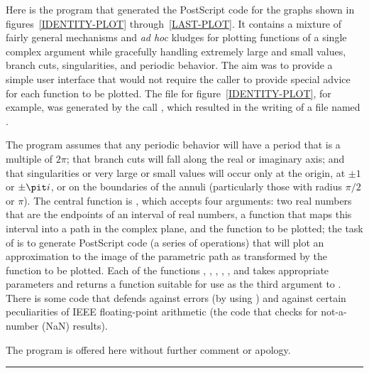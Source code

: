 \begin{new}

Here is the program that generated the PostScript code for
the graphs shown in figures~\ref{IDENTITY-PLOT} through~\ref{LAST-PLOT}.
It contains a mixture of fairly general mechanisms and {\it ad hoc} kludges
for plotting functions of a single complex argument while gracefully handling
extremely large and small values,
branch cuts, singularities, and periodic behavior.
The aim was to provide a simple user interface that would not
require the caller to provide special advice for each function
to be plotted.
The file for figure~\ref{IDENTITY-PLOT}, for example, was generated
by the call , which resulted in the writing of
a file named .

The program assumes that any periodic behavior will have a period that is a multiple of
$2\pi$; that branch cuts will fall along the real or imaginary axis;
and that singularities or very large or small values
will occur only at the origin, at $\pm 1$ or $\pm {\it i}$,
or on the boundaries of the annuli (particularly those with radius $\pi/2$ or $\pi$).
The central function is , which accepts four arguments:
two real numbers that are the endpoints of an interval of real numbers,
a function that maps this interval into a path in the complex plane,
and the function to be plotted; the task of  is to
generate PostScript code (a series of  operations)
that will plot an approximation to the image of the parametric path
as transformed by the function to be plotted.
Each of the functions , , , , ,
and  takes appropriate parameters
and returns a function suitable for use as the third argument
to .
There is some code that defends against errors
(by using ) and against certain peculiarities of
IEEE floating-point arithmetic (the code that checks for not-a-number (NaN) results).

The program is offered here without further comment or apology.

\hrule width 0pt\relax


\end{new}

